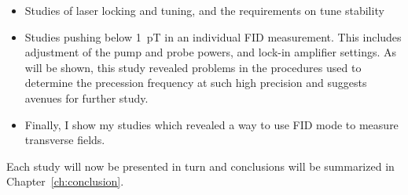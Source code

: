 \begin{itemize}
\item Studies of laser locking and tuning, and the requirements on
  tune stability
\item Studies pushing below 1~pT in an individual FID measurement.
  This includes adjustment of the pump and probe powers, and lock-in
  amplifier settings.  As will be shown, this study revealed problems
  in the procedures used to determine the precession frequency at such
  high precision and suggests avenues for further study.
\item Finally, I show my studies which revealed a way to use FID mode
  to measure transverse fields.
\end{itemize}
Each study will now be presented in turn and conclusions will be
summarized in Chapter~\ref{ch:conclusion}.






